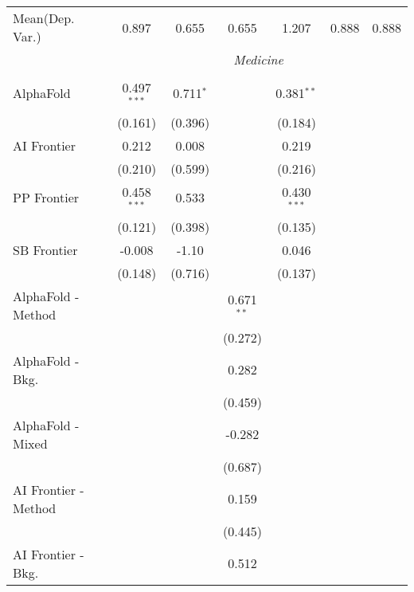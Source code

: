 \begin{tabular}{lcccccc}
Mean(Dep. Var.) & 0.897 & 0.655 & 0.655 & 1.207 & 0.888 & 0.888 \\
 & \multicolumn{6}{c}{\textit{Medicine}} \\ \\
   AlphaFold            & 0.497$^{***}$ & 0.711$^{*}$ &               & 0.381$^{**}$  &        &   \\   
                        & (0.161)       & (0.396)     &               & (0.184)       &        &   \\   
   AI Frontier          & 0.212         & 0.008       &               & 0.219         &        &   \\   
                        & (0.210)       & (0.599)     &               & (0.216)       &        &   \\   
   PP Frontier          & 0.458$^{***}$ & 0.533       &               & 0.430$^{***}$ &        &   \\   
                        & (0.121)       & (0.398)     &               & (0.135)       &        &   \\   
   SB Frontier          & -0.008        & -1.10       &               & 0.046         &        &   \\   
                        & (0.148)       & (0.716)     &               & (0.137)       &        &   \\   
   AlphaFold - Method   &               &             & 0.671$^{**}$  &               &        &   \\   
                        &               &             & (0.272)       &               &        &   \\   
   AlphaFold - Bkg.     &               &             & 0.282         &               &        &   \\   
                        &               &             & (0.459)       &               &        &   \\   
   AlphaFold - Mixed    &               &             & -0.282        &               &        &   \\   
                        &               &             & (0.687)       &               &        &   \\   
   AI Frontier - Method &               &             & 0.159         &               &        &   \\   
                        &               &             & (0.445)       &               &        &   \\   
   AI Frontier - Bkg.   &               &             & 0.512         &               &        &   \\   

\end{tabular}
